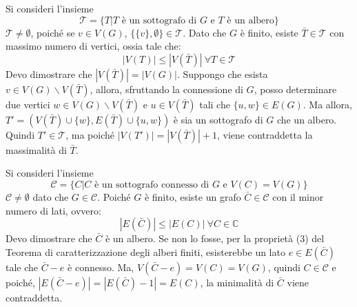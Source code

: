 \documentclass[12pt, a4paper]{report}
\theoremstyle{definition}
\begin{document}
\begin{demonstration}
    Si consideri l'insieme
    \[\mathcal{T}=\{T|T\text{ è un sottografo di $G$ e $T$ è un albero}\}\]
    $\mathcal{T}\neq\emptyset$, poiché se $v\in V(G)$, $\{\{v\},\emptyset\}\in\mathcal
    {T}$. Dato che $G$ è finito, esiste $\bar{T}\in\mathcal{T}$ con massimo numero
    di vertici, ossia tale che:
    \[|V(T)|\leq|V(\bar{T})|\ \forall T\in\mathcal{T}\]
    Devo dimostrare che $|V(\bar{T})|=|V(G)|$. Suppongo che esista $v\in V(G)
    \backslash V(\bar{T})$, allora, sfruttando la connessione di $G$, posso
    determinare due vertici $w\in V(G)\backslash V(\bar{T})$ e $u\in V(\bar{T})$
    tali che $\{u,w\}\in E(G)$. Ma allora, $T'=(V(\bar{T})\cup\{w\}, E(\bar{T})\cup
    \{u,w\})$ è sia un sottografo di $G$ che un albero. Quindi $T'\in\mathcal{T}$,
    ma poiché $|V(T')|=|V(\bar{T})|+1$, viene contraddetta la massimalità di
    $\bar{T}$.
\end{demonstration}

\newpage
\begin{demonstration}
    Si consideri l'insieme
    \[\mathcal{C}=\{C|C\text{ è un sottografo connesso di $G$ e }V(C)=V(G)\}\]
    $\mathcal{C}\neq\emptyset$ dato che $G\in\mathcal{C}$. Poiché $G$ è finito,
    esiste un grafo $\bar{C}\in\mathcal{C}$ con il minor numero di lati, ovvero:
    \[|E(\bar{C})|\leq|E(C)|\ \forall C\in\mathbb{C}\]
    Devo dimostrare che $\bar{C}$ è un albero. Se non lo fosse, per la proprietà
    (3) del Teorema di caratterizzazione degli alberi finiti, esisterebbe un lato
    $e\in E(\bar{C})$ tale che $\bar{C}-e$ è connesso. Ma, $V(\bar{C}-e)=V(C)=V(G)$,
    quindi $C\in\mathcal{C}$ e poiché, $|E(\bar{C}-e)|=|E(\bar{C})-1|=E(C)$, la
    minimalità di $\bar{C}$ viene contraddetta.
\end{demonstration}
\end{document}
